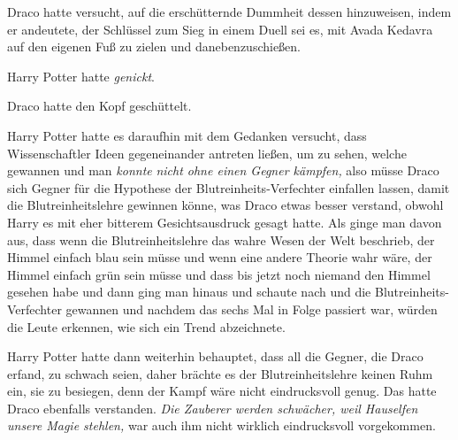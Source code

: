 Draco hatte versucht, auf die erschütternde Dummheit dessen hinzuweisen, indem er andeutete, der Schlüssel zum Sieg in einem Duell sei es, mit Avada Kedavra auf den eigenen Fuß zu zielen und danebenzuschießen.

Harry Potter hatte \emph{genickt}.

Draco hatte den Kopf geschüttelt.

Harry Potter hatte es daraufhin mit dem Gedanken versucht, dass Wissenschaftler Ideen gegeneinander antreten ließen, um zu sehen, welche gewannen und man \emph{konnte} \emph{nicht ohne einen Gegner kämpfen,} also müsse Draco sich Gegner für die Hypothese der Blutreinheits-Verfechter einfallen lassen, damit die Blutreinheitslehre gewinnen könne, was Draco etwas besser verstand, obwohl Harry es mit eher bitterem Gesichtsausdruck gesagt hatte. Als ginge man davon aus, dass wenn die Blutreinheitslehre das wahre Wesen der Welt beschrieb, der Himmel einfach blau sein müsse und wenn eine andere Theorie wahr wäre, der Himmel einfach grün sein müsse und dass bis jetzt noch niemand den Himmel gesehen habe und dann ging man hinaus und schaute nach und die Blutreinheits-Verfechter gewannen und nachdem das sechs Mal in Folge passiert war, würden die Leute erkennen, wie sich ein Trend abzeichnete.

Harry Potter hatte dann weiterhin behauptet, dass all die Gegner, die Draco erfand, zu schwach seien, daher brächte es der Blutreinheitslehre keinen Ruhm ein, sie zu besiegen, denn der Kampf wäre nicht eindrucksvoll genug. Das hatte Draco ebenfalls verstanden. \emph{Die Zauberer werden schwächer, weil Hauselfen unsere Magie stehlen,} war auch ihm nicht wirklich eindrucksvoll vorgekommen.

